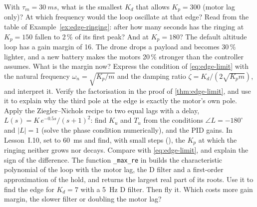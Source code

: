 \begin{exercises}
\exercise[1] With $\tau_m = \SI{30}{ms}$, what is the smallest $K_d$ that allows $K_p = 300$ (motor lag only)? At which frequency would the loop oscillate at that edge?
\exercise[1] Read from the table of Example~\ref{ex:edge-ringing}: after how many seconds has the ringing at $K_p = 150$ fallen to 2\,\% of its first peak? And at $K_p = 180$?
\exercise[1] The default altitude loop has a gain margin of 16. The drone drops a payload and becomes 30\,\% lighter, and a new battery makes the motors 20\,\% stronger than the controller assumes. What is the margin now?
\exercise[2] Express the condition of \cref{eq:edge-limit} with the natural frequency $\omega_n = \sqrt{K_p/m}$ and the damping ratio $\zeta = K_d/(2\sqrt{K_p m})$, and interpret it.
\exercise[2] Verify the factorisation in the proof of \cref{thm:edge-limit}, and use it to explain why the third pole at the edge is exactly the motor's own pole.
\exercise[2] Apply the Ziegler–Nichols recipe to two equal lags with a delay, $L(s) = K\,e^{-0.5s}/(s + 1)^2$: find $K_u$ and $T_u$ from the conditions $\angle L = -180^\circ$ and $|L| = 1$ (solve the phase condition numerically), and the PID gains.
\exercise[2] In Lesson~I.10, set  to \SI{60}{ms} and find, with small steps (), the $K_p$ at which the ringing neither grows nor decays. Compare with \cref{eq:edge-limit}, and explain the sign of the difference.
\exercise[2] The function \texttt{\_max\_re} in  builds the characteristic polynomial of the loop with the motor lag, the D filter and a first-order approximation of the hold, and returns the largest real part of its roots. Use it to find the edge for $K_d = 7$ with a \SI{5}{Hz} D filter. Then fly it. Which costs more gain margin, the slower filter or doubling the motor lag?

\end{exercises}
